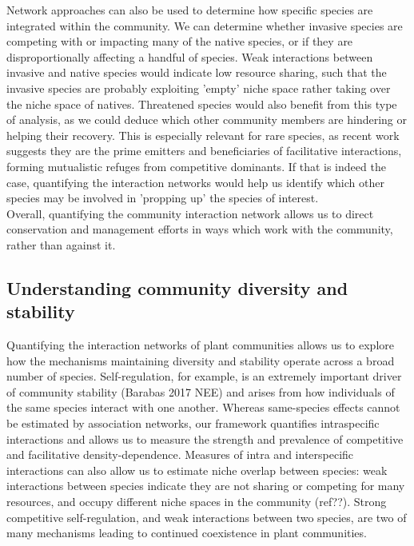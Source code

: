 \documentclass[a4,12pt]{article}
\begin{document}
        Network approaches can also be used to determine how specific species are integrated within the community. We can determine whether invasive species are competing with or impacting many of the native species, or if they are disproportionally affecting a handful of species. Weak interactions between invasive and native species would indicate low resource sharing, such that the invasive species are probably exploiting 'empty' niche space rather taking over the niche space of natives. Threatened species would also benefit from this type of analysis, as we could deduce which other community members are hindering or helping their recovery. This is especially relevant for rare species, as recent work suggests they are the prime emitters and beneficiaries of facilitative interactions, forming mutualistic refuges from competitive dominants. If that is indeed the case, quantifying the interaction networks would help us identify which other species may be involved in 'propping up' the species of interest.  \\

        Overall, quantifying the community interaction network allows us to direct conservation and management efforts in ways which work with the community, rather than against it.

      
    \subsection{Understanding community diversity and stability}

        Quantifying the interaction networks of plant communities allows us to explore how the mechanisms maintaining diversity and stability operate across a broad number of species. Self-regulation, for example, is an extremely important driver of community stability (Barabas 2017 NEE) and arises from how individuals of the same species interact with one another. Whereas same-species effects cannot be estimated by association networks, our framework quantifies intraspecific interactions and allows us to measure the strength and prevalence of competitive and facilitative density-dependence. Measures of intra and interspecific interactions can also allow us to estimate niche overlap between species: weak interactions between species indicate they are not sharing or competing for many resources, and occupy different niche spaces in the community (ref??). Strong competitive self-regulation, and weak interactions between two species, are two of many mechanisms leading to continued coexistence in plant communities.\\
\end{document}
